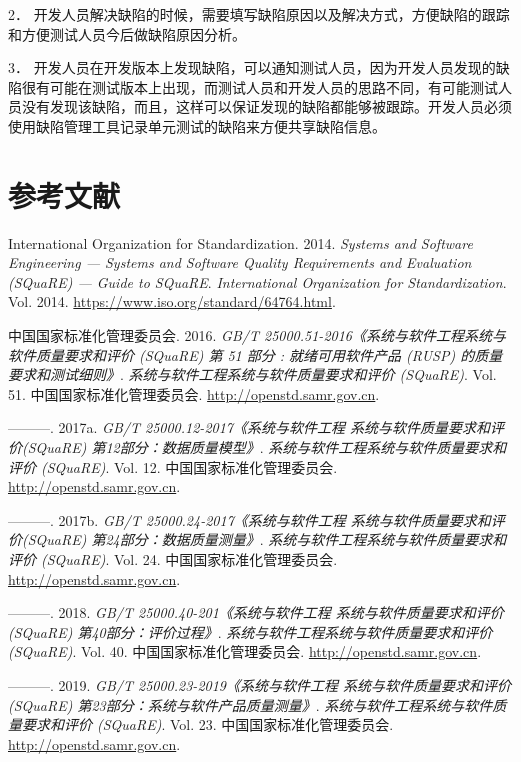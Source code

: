 \documentclass[hyperref, a4paper]{ctexart}
\begin{document}
2．
开发人员解决缺陷的时候，需要填写缺陷原因以及解决方式，方便缺陷的跟踪和方便测试人员今后做缺陷原因分析。

3．
开发人员在开发版本上发现缺陷，可以通知测试人员，因为开发人员发现的缺陷很有可能在测试版本上出现，而测试人员和开发人员的思路不同，有可能测试人员没有发现该缺陷，而且，这样可以保证发现的缺陷都能够被跟踪。开发人员必须使用缺陷管理工具记录单元测试的缺陷来方便共享缺陷信息。

\pagebreak

\hypertarget{ux53c2ux8003ux6587ux732e}{%
\section*{参考文献}\label{ux53c2ux8003ux6587ux732e}}

\hypertarget{refs}{}
\leavevmode\hypertarget{ref-innovativeInternationalisation}{}%
International Organization for Standardization. 2014. \emph{Systems and
Software Engineering --- Systems and Software Quality Requirements and
Evaluation (SQuaRE) --- Guide to SQuaRE}. \emph{International
Organization for Standardization}. Vol. 2014.
\url{https://www.iso.org/standard/64764.html}.

\leavevmode\hypertarget{ref-innovative1}{}%
中国国家标准化管理委员会. 2016. \emph{GB/T
25000.51-2016《系统与软件工程系统与软件质量要求和评价 (SQuaRE) 第 51
部分 : 就绪可用软件产品 (RUSP) 的质量要求和测试细则》}.
\emph{系统与软件工程系统与软件质量要求和评价 (SQuaRE)}. Vol. 51.
中国国家标准化管理委员会. \url{http://openstd.samr.gov.cn}.

\leavevmode\hypertarget{ref-innovative3}{}%
---------. 2017a. \emph{GB/T 25000.12-2017《系统与软件工程
系统与软件质量要求和评价(SQuaRE) 第12部分：数据质量模型》}.
\emph{系统与软件工程系统与软件质量要求和评价 (SQuaRE)}. Vol. 12.
中国国家标准化管理委员会. \url{http://openstd.samr.gov.cn}.

\leavevmode\hypertarget{ref-innovative4}{}%
---------. 2017b. \emph{GB/T 25000.24-2017《系统与软件工程
系统与软件质量要求和评价(SQuaRE) 第24部分：数据质量测量》}.
\emph{系统与软件工程系统与软件质量要求和评价 (SQuaRE)}. Vol. 24.
中国国家标准化管理委员会. \url{http://openstd.samr.gov.cn}.

\leavevmode\hypertarget{ref-innovative5}{}%
---------. 2018. \emph{GB/T 25000.40-201《系统与软件工程
系统与软件质量要求和评价(SQuaRE) 第40部分：评价过程》}.
\emph{系统与软件工程系统与软件质量要求和评价 (SQuaRE)}. Vol. 40.
中国国家标准化管理委员会. \url{http://openstd.samr.gov.cn}.

\leavevmode\hypertarget{ref-innovative2}{}%
---------. 2019. \emph{GB/T 25000.23-2019《系统与软件工程
系统与软件质量要求和评价(SQuaRE) 第23部分：系统与软件产品质量测量》}.
\emph{系统与软件工程系统与软件质量要求和评价 (SQuaRE)}. Vol. 23.
中国国家标准化管理委员会. \url{http://openstd.samr.gov.cn}.
\end{document}

